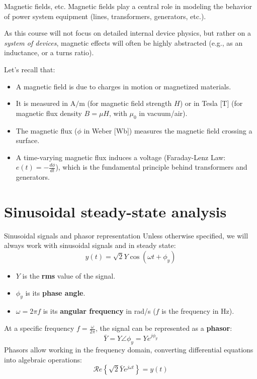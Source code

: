 \begin{frame}[allowframebreaks]{Magnetic fields, etc.}
  Magnetic fields play a central role in modeling the behavior of power system equipment (lines, transformers, generators, etc.).
  \vspace{0.2cm}

  As this course will not focus on detailed internal device physics, but rather on a \textit{system of devices}, magnetic effects will often be highly abstracted (e.g., as an inductance, or a turns ratio).
  \vspace{0.2cm}

  Let's recall that:
  \begin{itemize}
    \item A magnetic field is due to charges in motion or magnetized materials.
    \item It is measured in $\text{A/m}$ (for magnetic field strength $H$) or in Tesla [T] (for magnetic flux density $B = \mu H$, with $\mu_0$ in vacuum/air).
    \item The magnetic flux ($\phi$ in Weber [Wb]) measures the magnetic field crossing a surface.
    \item A time-varying magnetic flux induces a voltage (Faraday-Lenz Law: $e(t) = -\frac{d\phi}{dt}$), which is the fundamental principle behind transformers and generators.
  \end{itemize}
\end{frame}

\section{Sinusoidal steady-state analysis}

\begin{frame}[allowframebreaks]{Sinusoidal signals and phasor representation}
  Unless otherwise specified, we will always work with sinusoidal signals and in steady state:
  $$y(t) = \sqrt{2} Y \cos(\omega t + \phi_y)$$
  \begin{itemize}
    \item $Y$ is the \textbf{rms} value of the signal.
    \item $\phi_y$ is its \textbf{phase angle}.
    \item $\omega = 2\pi f$ is its \textbf{angular frequency} in rad/s ($f$ is the frequency in Hz).
  \end{itemize}
  \vspace{0.2cm}
  At a specific frequency $f = \frac{\omega}{2\pi}$, the signal can be represented as a \textbf{phasor}:
  $$\bar{Y} = Y \angle \phi_y = Y e^{j \phi_y}$$
  Phasors allow working in the frequency domain, converting differential equations into algebraic operations:
  $$\mathcal{R}e\left\{ \sqrt{2} \bar{Y} e^{j\omega t} \right\} = y(t)$$
\end{frame}


